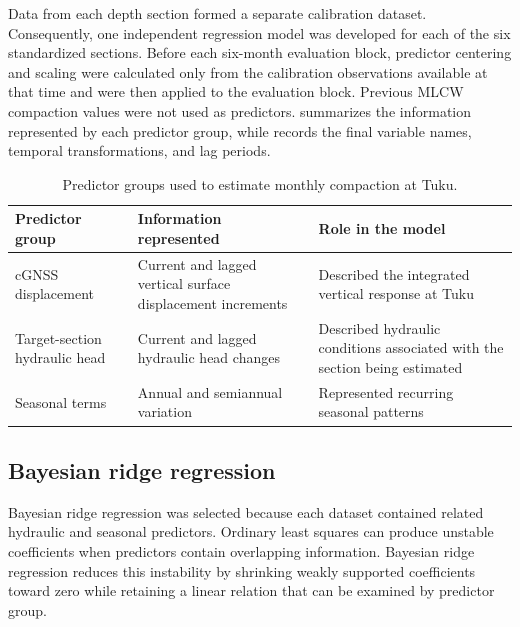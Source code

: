 Data from each depth section formed a separate calibration dataset. Consequently, one independent regression model was developed for each of the six standardized sections. Before each six-month evaluation block, predictor centering and scaling were calculated only from the calibration observations available at that time and were then applied to the evaluation block. Previous MLCW compaction values were not used as predictors.  summarizes the information represented by each predictor group, while  records the final variable names, temporal transformations, and lag periods.

\begin{table}[htbp]
  \centering
  \small
  \renewcommand{\arraystretch}{1.15}
  \caption{Predictor groups used to estimate monthly compaction at Tuku.}
  \label{tab:predictor_summary}
  \begin{tabularx}{\textwidth}{@{}p{}p{}X@{}}
    \toprule
    \textbf{Predictor group} & \textbf{Information represented} & \textbf{Role in the model} \\
    \midrule
    cGNSS displacement & Current and lagged vertical surface displacement increments & Described the integrated vertical response at Tuku \\
    Target-section hydraulic head & Current and lagged hydraulic head changes & Described hydraulic conditions associated with the section being estimated \\
    Seasonal terms & Annual and semiannual variation & Represented recurring seasonal patterns \\
    \bottomrule
  \end{tabularx}
\end{table}

\subsection{Bayesian ridge regression}
\label{subsec:bayesian_ridge}

Bayesian ridge regression was selected because each dataset contained related hydraulic and seasonal predictors. Ordinary least squares can produce unstable coefficients when predictors contain overlapping information. Bayesian ridge regression reduces this instability by shrinking weakly supported coefficients toward zero while retaining a linear relation that can be examined by predictor group.

